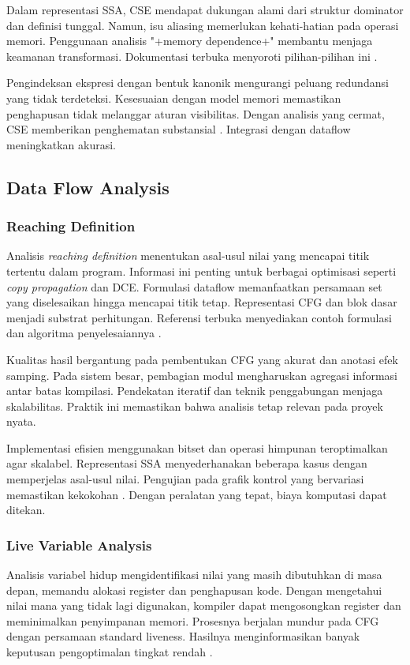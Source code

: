 \documentclass[../main.tex]{subfiles}
\begin{document}
Dalam representasi SSA, CSE mendapat dukungan alami dari struktur dominator dan definisi tunggal. Namun, isu aliasing memerlukan kehati-hatian pada operasi memori. Penggunaan analisis "+memory dependence+" membantu menjaga keamanan transformasi. Dokumentasi terbuka menyoroti pilihan-pilihan ini \citep{LLVMOverview}.

Pengindeksan ekspresi dengan bentuk kanonik mengurangi peluang redundansi yang tidak terdeteksi. Kesesuaian dengan model memori memastikan penghapusan tidak melanggar aturan visibilitas. Dengan analisis yang cermat, CSE memberikan penghematan substansial \citep{WikiCSE}. Integrasi dengan dataflow meningkatkan akurasi.

\subsection{Data Flow Analysis}
\subsubsection{Reaching Definition}
Analisis \emph{reaching definition} menentukan asal-usul nilai yang mencapai titik tertentu dalam program. Informasi ini penting untuk berbagai optimisasi seperti \emph{copy propagation} dan DCE. Formulasi dataflow memanfaatkan persamaan set yang diselesaikan hingga mencapai titik tetap. Representasi CFG dan blok dasar menjadi substrat perhitungan. Referensi terbuka menyediakan contoh formulasi dan algoritma penyelesaiannya \citep{WikiReachingDef}.

Kualitas hasil bergantung pada pembentukan CFG yang akurat dan anotasi efek samping. Pada sistem besar, pembagian modul mengharuskan agregasi informasi antar batas kompilasi. Pendekatan iteratif dan teknik penggabungan menjaga skalabilitas. Praktik ini memastikan bahwa analisis tetap relevan pada proyek nyata.

Implementasi efisien menggunakan bitset dan operasi himpunan teroptimalkan agar skalabel. Representasi SSA menyederhanakan beberapa kasus dengan memperjelas asal-usul nilai. Pengujian pada grafik kontrol yang bervariasi memastikan kekokohan \citep{WikiReachingDef}. Dengan peralatan yang tepat, biaya komputasi dapat ditekan.

\subsubsection{Live Variable Analysis}
Analisis variabel hidup mengidentifikasi nilai yang masih dibutuhkan di masa depan, memandu alokasi register dan penghapusan kode. Dengan mengetahui nilai mana yang tidak lagi digunakan, kompiler dapat mengosongkan register dan meminimalkan penyimpanan memori. Prosesnya berjalan mundur pada CFG dengan persamaan standard liveness. Hasilnya menginformasikan banyak keputusan pengoptimalan tingkat rendah \citep{WikiLiveVariables}.
\end{document}
